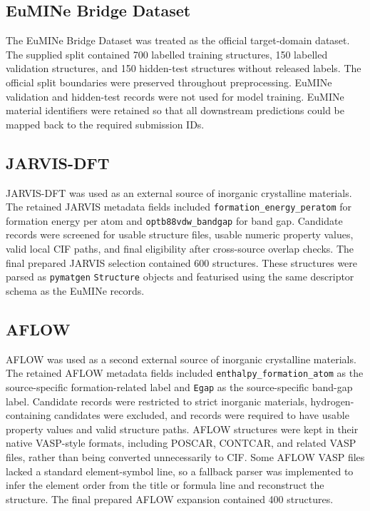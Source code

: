 \documentclass[10pt, a4paper]{article}
\begin{document}
\subsection{EuMINe Bridge Dataset}
The EuMINe Bridge Dataset was treated as the official target-domain dataset. The supplied split contained 700 labelled training structures, 150 labelled validation structures, and 150 hidden-test structures without released labels. The official split boundaries were preserved throughout preprocessing. EuMINe validation and hidden-test records were not used for model training. EuMINe material identifiers were retained so that all downstream predictions could be mapped back to the required submission IDs.

\subsection{JARVIS-DFT}
JARVIS-DFT was used as an external source of inorganic crystalline materials. The retained JARVIS metadata fields included \texttt{formation\_energy\_peratom} for formation energy per atom and \texttt{optb88vdw\_bandgap} for band gap. Candidate records were screened for usable structure files, usable numeric property values, valid local CIF paths, and final eligibility after cross-source overlap checks. The final prepared JARVIS selection contained 600 structures. These structures were parsed as \texttt{pymatgen} \texttt{Structure} objects and featurised using the same descriptor schema as the EuMINe records.

\subsection{AFLOW}
AFLOW was used as a second external source of inorganic crystalline materials. The retained AFLOW metadata fields included \texttt{enthalpy\_formation\_atom} as the source-specific formation-related label and \texttt{Egap} as the source-specific band-gap label. Candidate records were restricted to strict inorganic materials, hydrogen-containing candidates were excluded, and records were required to have usable property values and valid structure paths. AFLOW structures were kept in their native VASP-style formats, including POSCAR, CONTCAR, and related VASP files, rather than being converted unnecessarily to CIF. Some AFLOW VASP files lacked a standard element-symbol line, so a fallback parser was implemented to infer the element order from the title or formula line and reconstruct the structure. The final prepared AFLOW expansion contained 400 structures.
\end{document}

